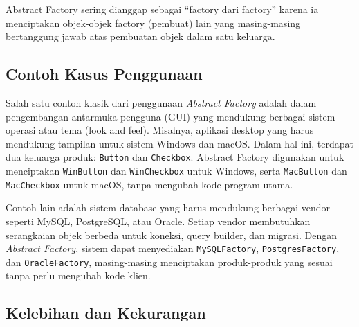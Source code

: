 Abstract Factory sering dianggap sebagai “factory dari factory” karena ia menciptakan objek-objek factory (pembuat) lain yang masing-masing bertanggung jawab atas pembuatan objek dalam satu keluarga.

\subsection{Contoh Kasus Penggunaan}

Salah satu contoh klasik dari penggunaan \textit{Abstract Factory} adalah dalam pengembangan antarmuka pengguna (GUI) yang mendukung berbagai sistem operasi atau tema (look and feel). Misalnya, aplikasi desktop yang harus mendukung tampilan untuk sistem Windows dan macOS. Dalam hal ini, terdapat dua keluarga produk: \texttt{Button} dan \texttt{Checkbox}. Abstract Factory digunakan untuk menciptakan \texttt{WinButton} dan \texttt{WinCheckbox} untuk Windows, serta \texttt{MacButton} dan \texttt{MacCheckbox} untuk macOS, tanpa mengubah kode program utama.

Contoh lain adalah sistem database yang harus mendukung berbagai vendor seperti MySQL, PostgreSQL, atau Oracle. Setiap vendor membutuhkan serangkaian objek berbeda untuk koneksi, query builder, dan migrasi. Dengan \textit{Abstract Factory}, sistem dapat menyediakan \texttt{MySQLFactory}, \texttt{PostgresFactory}, dan \texttt{OracleFactory}, masing-masing menciptakan produk-produk yang sesuai tanpa perlu mengubah kode klien.

\subsection{Kelebihan dan Kekurangan}

